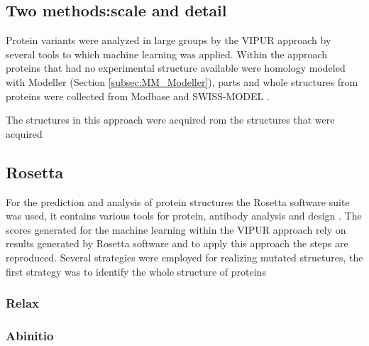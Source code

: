 
\subsection{Two methods:scale and detail}
Protein variants were analyzed in large groups by the VIPUR approach by several tools to which machine learning was applied. Within the approach proteins that had no experimental structure available were homology modeled with Modeller (Section \ref{subsec:MM_Modeller}), parts and whole structures from proteins were collected from Modbase \cite{} and
 SWISS-MODEL \cite{} .


 The structures in this approach were acquired rom the structures that were acquired 

\subsection{Rosetta}
For the prediction and analysis of protein structures the Rosetta software suite was used, it contains various tools for protein, antibody analysis and design \cite{}.
The scores generated for the machine learning within the VIPUR approach rely on results generated by Rosetta software and to apply this approach the steps are reproduced.  
Several strategies were employed for realizing mutated structures, the first strategy was to identify the whole structure of proteins



\subsubsection{Relax}
\label{subsubsec:MM_Relax}

\subsubsection{Abinitio}
\label{subsubsec:MM_Abinitio}

